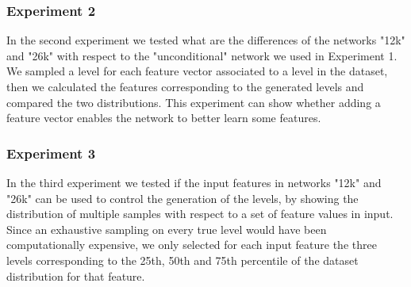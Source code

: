 \subsubsection{Experiment 2}
In the second experiment we tested what are the differences of the networks "12k" and "26k" with respect to the "unconditional" network we used in Experiment 1. We sampled a level for each feature vector associated to a level in the dataset, then we calculated the features corresponding to the generated levels and compared the two distributions. This experiment can show whether adding a feature vector enables the network to better learn some features.

\subsubsection{Experiment 3}
In the third experiment we tested if the input features in networks "12k" and "26k" can be used to control the generation of the levels, by showing the distribution of multiple samples with respect to a set of feature values in input. Since an exhaustive sampling on every true level would have been computationally expensive, we only selected for each input feature the three levels corresponding to the 25th, 50th and 75th percentile of the dataset distribution for that feature. %

